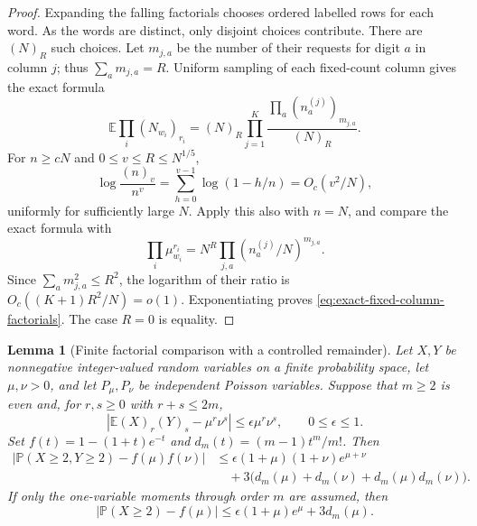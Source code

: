 \documentclass[11pt]{article}
\numberwithin{equation}{section}
\newtheorem{lemma}[theorem]{Lemma}
\theoremstyle{definition}
\theoremstyle{remark}
\newcommand{\E}{\mathbb E}
\newcommand{\Pp}{\mathbb P}
\newcommand{\1}{\mathbf 1}
\begin{document}
\begin{proof}
Expanding the falling factorials chooses ordered labelled rows for each
word. As the words are distinct, only disjoint choices contribute. There
are $(N)_R$ such choices. Let $m_{j,a}$ be the number of their requests for
digit $a$ in column $j$; thus $\sum_a m_{j,a}=R$.
Uniform sampling of each fixed-count column gives the exact formula
\[
 \E\prod_i(N_{w_i})_{r_i}
 =(N)_R\prod_{j=1}^K
                \frac{\prod_a(n_a^{(j)})_{m_{j,a}}}{(N)_R}.
\]
For $n\ge cN$ and $0\le v\le R\le N^{1/5}$,
\[
 \log\frac{(n)_v}{n^v}
 =\sum_{h=0}^{v-1}\log(1-h/n)=O_c(v^2/N),
\]
uniformly for sufficiently large $N$. Apply this also with $n=N$,
and compare the exact formula with
\[
 \prod_i\mu_{w_i}^{r_i}
   =N^R\prod_{j,a}(n_a^{(j)}/N)^{m_{j,a}}.
\]
Since $\sum_a m_{j,a}^2\le R^2$, the logarithm of their ratio is
$O_c((K+1)R^2/N)=o(1)$. Exponentiating proves
\eqref{eq:exact-fixed-column-factorials}. The case $R=0$ is equality.
\end{proof}

\begin{lemma}[Finite factorial comparison with a controlled remainder]
\label{lem:central-window}
Let $X,Y$ be nonnegative integer-valued random variables on a finite probability space, let $\mu,\nu>0$,
and let $P_\mu,P_\nu$ be independent Poisson variables. Suppose that $m\ge2$
is even and, for $r,s\ge0$ with $r+s\le2m$,
\[
 \left|\E(X)_r(Y)_s-\mu^r\nu^s\right|
 \le\epsilon\mu^r\nu^s,\qquad 0\le\epsilon\le1.
\]
Set $f(t)=1-(1+t)e^{-t}$ and $d_m(t)=(m-1)t^m/m!$. Then
\begin{align*}
 \left|\Pp(X\ge2,Y\ge2)-f(\mu)f(\nu)\right|
 &\le \epsilon(1+\mu)(1+\nu)e^{\mu+\nu}\\
 &\quad+3\bigl(d_m(\mu)+d_m(\nu)+d_m(\mu)d_m(\nu)\bigr).
\end{align*}
If only the one-variable moments through order $m$ are assumed, then
\[
 \left|\Pp(X\ge2)-f(\mu)\right|
 \le\epsilon(1+\mu)e^\mu+3d_m(\mu).
\]
\end{lemma}
\end{document}
